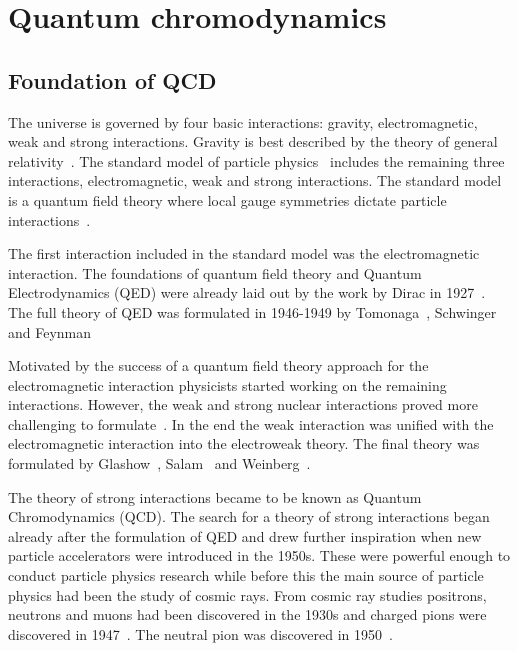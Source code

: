 \pagebreak
\section{Quantum chromodynamics}
\subsection{Foundation of QCD}
The universe is governed by four basic interactions: gravity, electromagnetic, weak and strong interactions. Gravity is best described by the theory of general relativity~\cite{Einstein1915}. The standard model of particle physics~\cite{Tanabashi:2018oca} includes the remaining three interactions, electromagnetic, weak and strong interactions.  The standard model is a quantum field theory where local gauge symmetries dictate  particle interactions~\cite{Perkins:1982xb}. 

The first interaction included in the standard model was the electromagnetic interaction. The foundations of quantum field theory and Quantum Electrodynamics (QED) were already laid out by the work by Dirac in 1927~\cite{doi:10.1098/rspa.1927.0039}. The full theory of QED was formulated in 1946-1949 by Tomonaga~\cite{Tomonaga:1946zz},  Schwinger~\cite{Schwinger:1948yj,Schwinger:1948yk} and Feynman~\cite{Feynman:1948fi}%

Motivated by the success of a quantum field theory approach for the electromagnetic interaction physicists started working on the remaining interactions. However, the weak and strong nuclear interactions proved more challenging to formulate~\cite{Krauss:2017}. In the end the weak interaction was unified with the electromagnetic interaction into the electroweak theory. The final theory was formulated by Glashow~\cite{Glashow:1970gm}, Salam~\cite{Salam:1964ry} and Weinberg~\cite{Weinberg:1967tq}.

The theory of strong interactions became to be known as Quantum Chromodynamics (QCD). The search for a theory of strong interactions began already after the formulation of QED and drew further inspiration when new particle accelerators were introduced in the 1950s. These were powerful enough to conduct particle physics research while before this the main source of particle physics had been the study of cosmic rays. From cosmic ray studies positrons, neutrons and muons had been discovered in the 1930s and charged pions were discovered in 1947~\cite{Occhialini:1987nr,Lattes:1947mx}. The neutral pion was discovered in 1950~\cite{Bjorklund:1950}.

